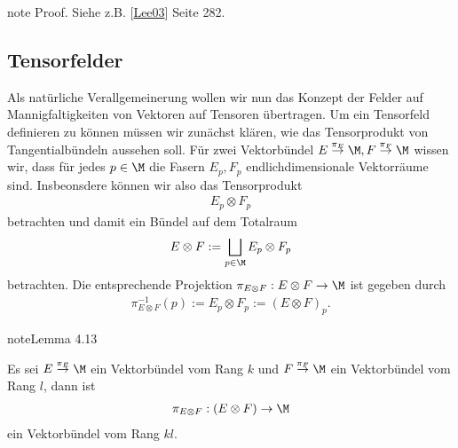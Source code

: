 \documentclass[letterpaper,10pt,english]{jupyterBook}
\begin{document}
\begin{sphinxadmonition}{note}
\sphinxAtStartPar
Proof. Siehe z.B. {[}\hyperlink{cite.references:id15}{Lee03}{]} Seite 282.
\end{sphinxadmonition}


\subsection{Tensorfelder}
\label{\detokenize{manifolds/tangential:tensorfelder}}
\sphinxAtStartPar
Als natürliche Verallgemeinerung wollen wir nun das Konzept der Felder auf Mannigfaltigkeiten von Vektoren auf Tensoren übertragen. Um ein Tensorfeld definieren zu können müssen wir zunächst klären, wie das Tensorprodukt von Tangentialbündeln aussehen soll. Für zwei Vektorbündel \(E\overset{\pi_E}{\to}{\M}, F\overset{\pi_F}{\to}{\M}\) wissen wir, dass für jedes \(p\in\M\) die Fasern \(E_p, F_p\) endlichdimensionale Vektorräume sind. Insbeonsdere können wir also das Tensorprodukt
\begin{equation*}
\begin{split}E_p\otimes F_p\end{split}
\end{equation*}
\sphinxAtStartPar
betrachten und damit ein Bündel auf dem Totalraum
\begin{equation*}
\begin{split}E\otimes F:= \bigsqcup_{p\in\M} E_p\otimes F_p\end{split}
\end{equation*}
\sphinxAtStartPar
betrachten. Die entsprechende Projektion \(\pi_{E\otimes F}:E\otimes F\to\M\) ist gegeben durch
\begin{equation*}
\begin{split}\pi_{E\otimes F}^{-1}(p):= E_p\otimes F_p := (E\otimes F)_p.\end{split}
\end{equation*}\label{manifolds/tangential:lem:tensorbundle}
\begin{sphinxadmonition}{note}{Lemma 4.13}



\sphinxAtStartPar
Es sei \(E\overset{\pi_E}{\to}{\M}\) ein Vektorbündel vom Rang \(k\) und \(F\overset{\pi_F}{\to}{\M}\) ein Vektorbündel vom Rang \(l\), dann ist
\begin{equation*}
\begin{split}\pi_{E\otimes F}:(E\otimes F)\to \M\end{split}
\end{equation*}
\sphinxAtStartPar
ein Vektorbündel vom Rang \(kl\).
\end{sphinxadmonition}
\end{document}
